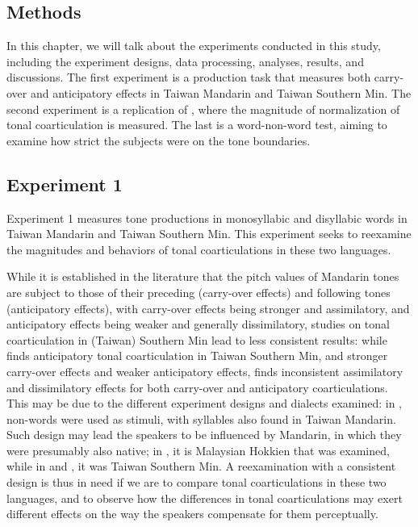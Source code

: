 \documentclass[12pt]{report}
\begin{document}
\begin{CJK}{UTF8}{bsmi}

\pagebreak
\chapter{Methods}

In this chapter, we will talk about the experiments conducted in this study, including the experiment designs, data processing, analyses, results, and discussions. The first experiment is a production task that measures both carry-over and anticipatory effects in Taiwan Mandarin and Taiwan Southern Min. The second experiment is a replication of \cite{Zhangetal2022}, where the magnitude of normalization of tonal coarticulation is measured. The last is a word-non-word test, aiming to examine how strict the subjects were on the tone boundaries.


\section{Experiment 1}
Experiment 1 measures tone productions in monosyllabic and disyllabic words in Taiwan Mandarin and Taiwan Southern Min. This experiment seeks to reexamine the magnitudes and behaviors of tonal coarticulations in these two languages.

While it is established in the literature that the pitch values of Mandarin tones are subject to those of their preceding (carry-over effects) and following tones (anticipatory effects), with carry-over effects being stronger and assimilatory, and anticipatory effects being weaker and generally dissimilatory, studies on tonal coarticulation in (Taiwan) Southern Min lead to less consistent results: while \cite{Peng1997} finds anticipatory tonal coarticulation in Taiwan Southern Min, and \cite{Wang2002} stronger carry-over effects and weaker anticipatory effects, \cite{ChangHsieh2012} finds inconsistent assimilatory and dissimilatory effects for both carry-over and anticipatory coarticulations. This may be due to the different experiment designs and dialects examined: in \cite{Wang2002}, non-words were used as stimuli, with syllables also found in Taiwan Mandarin. Such design may lead the speakers to be influenced by Mandarin, in which they were presumably also native; in \cite{ChangHsieh2012}, it is Malaysian Hokkien that was examined, while in \cite{Peng1997} and \cite{Wang2002}, it was Taiwan Southern Min. A reexamination with a consistent design is thus in need if we are to compare tonal coarticulations in these two languages, and to observe how the differences in tonal coarticulations may exert different effects on the way the speakers compensate for them perceptually.


\end{CJK}
\end{document}
